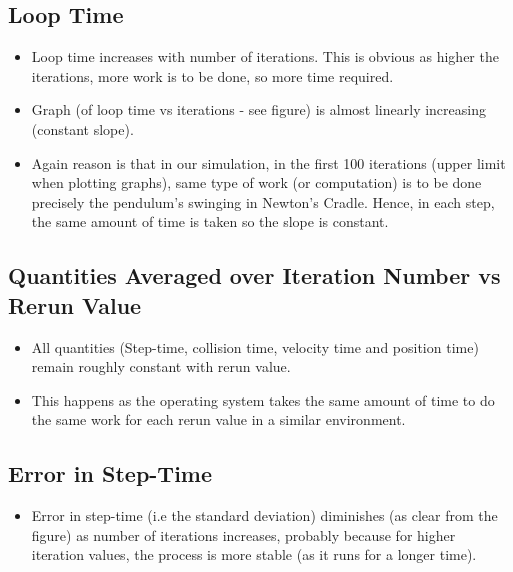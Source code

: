 \documentclass [a4paper, 11pt] {article}
\begin{document}
\subsection{Loop Time}
\begin{itemize}
	\item Loop time increases with number of iterations. This is obvious as higher the iterations, more work is to be done, so more time required.
	\item Graph (of loop time vs iterations - see figure) is almost linearly increasing (constant slope).
	\item Again reason is that in our simulation, in the first 100 iterations (upper limit when plotting graphs), same type of work (or computation) is to be done precisely the  pendulum's swinging in Newton's Cradle. Hence, in each step, the same amount of time is taken so the slope is constant.
\end{itemize}

\subsection{Quantities Averaged over Iteration Number vs Rerun Value}
\begin{itemize}
	\item All quantities (Step-time, collision time, velocity time and position time) remain roughly constant with rerun value.\\
	\item This happens as the operating system takes the same amount of time to do the same work for each rerun value in a similar environment.
\end{itemize}

\subsection{Error in Step-Time}
\begin{itemize}
	\item Error in step-time (i.e the standard deviation) diminishes (as clear from the figure) as number of iterations increases, probably because for higher iteration values, the process is more stable (as it runs for a longer time).
\end{itemize}
\end{document}
